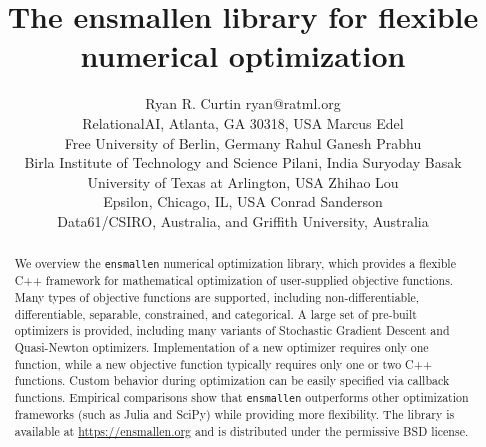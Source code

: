 \documentclass[twoside,11pt]{article}
\begin{document}
\title{The ensmallen library for flexible numerical optimization}

\author{\name Ryan R. Curtin \email ryan@ratml.org \\
       \addr RelationalAI, Atlanta, GA 30318, USA
       \AND
       \name Marcus Edel\\
       \addr Free University of Berlin, Germany
       \AND
       \name Rahul Ganesh Prabhu \\
       \addr Birla Institute of Technology and Science Pilani, India
       \AND
       \name Suryoday Basak \\
       \addr University of Texas at Arlington, USA
       \AND
       \name Zhihao Lou \\
       \addr Epsilon, Chicago, IL, USA
       \AND
       \name Conrad Sanderson \\
       \addr Data61/CSIRO, Australia, and Griffith University, Australia}


\maketitle

\begin{abstract}%
We overview the {\tt ensmallen} numerical optimization library,
which provides a flexible C++ framework
for mathematical optimization of user-supplied objective functions.
Many types of objective functions are supported,
including non-differentiable, differentiable, separable, constrained, and categorical.
A large set of pre-built optimizers is provided,
including many variants of Stochastic Gradient Descent and Quasi-Newton optimizers.
Implementation of a new optimizer requires only one function,
while a new objective function typically requires only one or two C++ functions.
Custom behavior during optimization can be easily specified via callback functions.
Empirical comparisons show that {\tt ensmallen}
outperforms other optimization frameworks (such as Julia and SciPy)
while providing more flexibility.
The library is available at \url{https://ensmallen.org}
and is distributed under the permissive BSD license.

\end{abstract}
\end{document}
